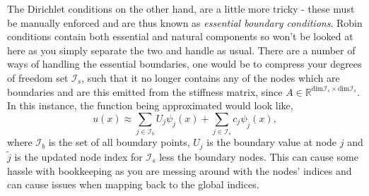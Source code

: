 The Dirichlet conditions on the other hand, are a little more tricky - these must be manually enforced and are thus known as \textit{essential boundary conditions}. Robin conditions contain both essential and natural components so won't be looked at here as you simply separate the two and handle as usual. There are a number of ways of handling the essential boundaries, one would be to compress your degrees of freedom set $\mathcal{I}_s$, such that it no longer contains any of the nodes which are boundaries and are this emitted from the stiffness matrix, since $A \in \mathbb{R}^{\text{dim} \mathcal{I}_s \times \text{dim}\mathcal{I}_s}$. In this instance, the function being approximated would look like,
\begin{equation}
	u(x) \approx \sum_{j\in\mathcal{I}_b}U_j\psi_j(x) + \sum_{j\in\mathcal{I}_s}c_j\psi_{\tilde j}(x),
\end{equation}
where $\mathcal{I}_b$ is the set of all boundary points, $U_j$ is the boundary value at node $j$ and $\tilde{j}$ is the updated node index for $\mathcal{I}_s$ less the boundary nodes. This can cause some hassle with bookkeeping as you are messing around with the nodes' indices and can cause issues when mapping back to the global indices.

